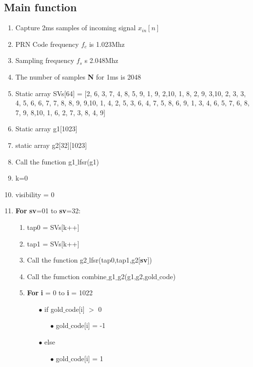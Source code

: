 \documentclass[journal,10pt,onecolumn]{article}
\begin{document}
\subsection{Main function}
\begin{enumerate}
\item Capture 2ms samples of incoming signal $x_{in}[n]$
\item PRN Code frequency $f_c$ is 1.023Mhz
\item Sampling frequency $f_s$ s 2.048Mhz
\item The number of samples \textbf{N} for 1ms is 2048 

    \item Static array SVs[64] = [2, 6,
    3, 7,
    4, 8,
    5, 9,
    1, 9,
    2,10,
    1, 8,
    2, 9,
    3,10,
    2, 3,
    3, 4,
    5, 6,
    6, 7,
    7, 8,
    8, 9,
    9,10,
    1, 4,
    2, 5,
    3, 6,
    4, 7,
    5, 8, 
    6, 9,
    1, 3,
    4, 6,
    5, 7, 
    6, 8,
    7, 9,
    8,10,
    1, 6,
    2, 7,
    3, 8,
    4, 9]
    \item Static array g1[1023]
    \item static array g2[32][1023]
    \item Call the function g1$\_$lfsr(g1)
    \item k=0
    \item visibility = 0
	\item \textbf{For} \textbf{sv}=01 to \textbf{sv}=32:
	\begin{enumerate}
    \renewcommand{\labelenumii}{\roman{enumii}}
        \item tap0 = SVs[k++]
        \item tap1 = SVs[k++]
        \item Call the function g2$\_$lfsr(tap0,tap1,g2[\textbf{sv}])
        \item Call the fumction combine$\_$g1$\_$g2(g1,g2,gold$\_$code) 
        \item \textbf{For} \textbf{i} = 0 to \textbf{i} = 1022
        \begin{enumerate}
            \item[$\bullet$] if gold$\_$code[i] $>$  0 
            \begin{enumerate}
                \item[$\bullet$]  gold$\_$code[i] = -1
            \end{enumerate}
            \item[$\bullet$] else
            \begin{enumerate}
                \item[$\bullet$]  gold$\_$code[i] = 1
            \end{enumerate}
        \end{enumerate}


\end{enumerate}
\end{enumerate}
\end{document}
